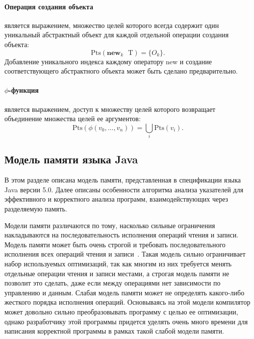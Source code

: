 \documentclass[14pt,titlepage]{extarticle}
\newcommand{\NEWi}[1]{\textbf{new}_{#1}\textbf{ }}
\newcommand{\Pts}[1]{\textrm{Pts}(#1)}
\let\oldphi\phi
\renewcommand{\phi}{\ensuremath{\oldphi}}
\newcommand{\eng}[1]{{\English#1}}
\newcommand{\java}{\eng{Java}\xspace}
\begin{document}
        \paragraph{Операция создания объекта} является выражением, множество
        целей которого всегда содержит один уникальный абстрактный объект для
        каждой отдельной операции создания объекта:
        \[\Pts{\NEWi{k} \textrm{T}} = \{O_k\}.\]
        Добавление уникального индекса каждому оператору \eng{new} и создание
        соответствующего абстрактного объекта может быть сделано
        предварительно.

        \paragraph{\phi-функция} является выражением, доступ к множеству целей
        которого возвращает объединение множества целей ее аргументов:
        \[\Pts{\phi(v_0, \ldots, v_n)} = \bigcup\limits_{i} \Pts{v_i}.\]

    \subsection{\texorpdfstring{Модель памяти языка \java}
                               {Модель памяти языка Java}}

      В этом разделе описана модель памяти, представленная в спецификации языка
      \java версии 5.0.
      Далее описаны особенности алгоритма анализа указателей для
      эффективного и корректного анализа программ, взаимодействующих через
      разделяемую память.

      Модели памяти различаются по тому, насколько сильные ограничения
      накладываются на последовательность исполнения операций чтения и
      записи.
      Модель памяти может быть очень строгой и требовать последовательного
      исполнения всех операций чтения и записи~\cite{lamport}.
      Такая модель сильно ограничивает набор используемых оптимизаций,
      так как многим из них требуется менять отдельные операции чтения и
      записи местами, а строгая модель памяти не позволит это сделать, даже
      если между операциями нет зависимости по управлению и данным.
      Слабая модель памяти может не определять какого-либо жесткого порядка
      исполнения операций. Основываясь на этой модели компилятор может
      довольно сильно преобразовывать программу с целью ее оптимизации,
      однако разработчику этой программы придется уделять очень много времени
      для написания корректной программы в рамках такой слабой модели памяти.
\end{document}

